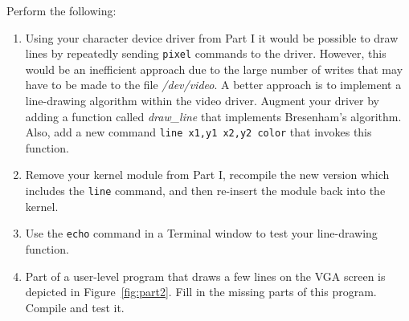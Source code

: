 \documentclass[epsfig,10pt,fullpage]{article}
\begin{document}
\newpage
\noindent
Perform the following:

\begin{enumerate}

\item Using your character device driver from Part I it would be possible to draw lines by 
repeatedly sending \texttt{pixel} commands to the driver. However, this would be an inefficient
approach due to the large number of writes that may have to be made to the file {\it /dev/video}.
A better approach is to implement a line-drawing algorithm within the video driver. Augment
your driver by adding a function called {\it draw\_line} that implements Bresenham's algorithm.
Also, add a new command \texttt{line x1,y1 x2,y2 color} that invokes this function.
		  
\item Remove your kernel module from Part I, recompile the new version which includes the
\texttt{line} command, and then re-insert the module back into the kernel.
\item Use the \texttt{echo} command in a Terminal window to test your line-drawing function.
\item Part of a user-level program that draws a few lines on the VGA screen is depicted in
Figure~\ref{fig:part2}. Fill in the missing parts of this program. Compile and test it.
\end{enumerate}
\end{document}
